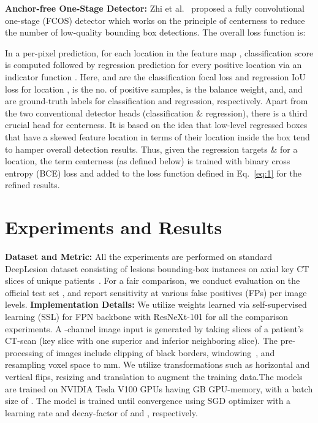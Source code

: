 \documentclass{article}
\begin{document}
\noindent \textbf{Anchor-free One-Stage Detector:} Zhi et al.~\cite{tian2019fcos} proposed a fully convolutional one-stage (FCOS) detector which works on the principle of centerness to reduce the number of low-quality bounding box detections. The overall loss function is:
\vspace{-3mm}


 In a per-pixel prediction, for each location  in the feature map , classification score  is computed followed by regression prediction  for every positive location via an indicator function . Here,  and  are the classification focal loss and regression IoU loss for location ,  is the no. of positive samples,  is the balance weight, and,  and  are ground-truth labels for classification and regression, respectively. Apart from the two conventional detector heads (classification \& regression), there is a third crucial head for centerness. It is based on the idea that low-level regressed boxes that have a skewed feature location in terms of their location inside the box tend to hamper overall detection results. Thus, given the regression targets
 \&   for a location, the term centerness (as defined below) is trained with binary cross entropy (BCE) loss and added to the loss function defined in Eq.~\ref{eq:1} for the refined results.
\vspace{-2mm}



\section{Experiments and Results}
\label{sec:res}
\vspace{-3mm}
\textbf{Dataset and Metric:}
All the experiments are performed on standard DeepLesion dataset consisting of  lesions bounding-box instances on  axial key CT slices of  unique patients~\cite{yan2018deeplesion}. For a fair comparison, we conduct evaluation on the official test set , and report sensitivity at various false positives (FPs) per image levels.
\noindent \textbf{Implementation Details:} We utilize weights learned via self-supervised learning (SSL) for FPN backbone with ResNeXt-101 for all the comparison experiments. A -channel image input is generated by taking  slices of a patient's CT-scan (key slice with one superior and inferior neighboring slice). The pre-processing of images include clipping of black borders, windowing~\cite{xue2012window}, and resampling voxel space to  mm. We utilize transformations such as horizontal and vertical flips, resizing and translation to augment the training data.The models are trained on NVIDIA Tesla V100 GPUs having GB GPU-memory, with a batch size of . The model is trained until convergence using SGD optimizer with a learning rate and decay-factor of  and , respectively.
\end{document}

